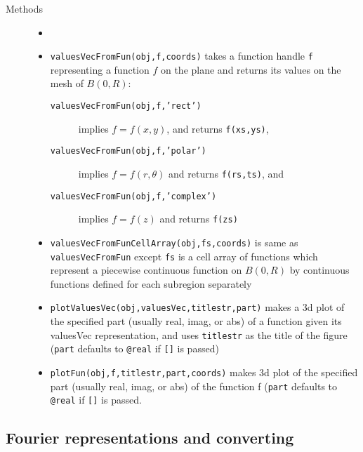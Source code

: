 \begin{description}
 \item[Methods]
   \begin{itemize}
    \item[] %
    \item {\tt valuesVecFromFun(obj,f,coords)} 
          takes a function handle {\tt f} representing a 
          function $f$ on the 
          plane and returns its values on the mesh of $B(0,R)$:
         \begin{description}
          \item[{\tt valuesVecFromFun(obj,f,'rect')}] implies
          $f = f(x,y)$, and returns 
          {\tt f(xs,ys)}, 
          \item[{\tt valuesVecFromFun(obj,f,'polar')}] implies
          $f = f(r,\theta)$ and returns
          {\tt f(rs,ts)}, and
          \item[{\tt valuesVecFromFun(obj,f,'complex')}] implies
          $f = f(z)$ and returns
          {\tt f(zs)}
         \end{description}
    \item {\tt valuesVecFromFunCellArray(obj,fs,coords)} is same
          as {\tt valuesVecFromFun} except {\tt fs} is
          a cell array of functions which represent a piecewise
          continuous function on $B(0,R)$ by continuous functions
          defined for each subregion separately
    \item {\tt plotValuesVec(obj,valuesVec,titlestr,part)}
          makes a 3d plot of the specified part 
          (usually real, imag, or abs)
          of a function given its 
          valuesVec representation, and uses {\tt titlestr} 
          as the title of the
          figure ({\tt part} defaults to {\tt @real} 
          if {\tt []} is passed)
    \item {\tt plotFun(obj,f,titlestr,part,coords)} makes
          3d plot of the specified part (usually real, imag,
          or abs) of the function f
          ({\tt part} defaults to {\tt @real} if {\tt []} is passed.
   \end{itemize}
\end{description}

\subsection{Fourier representations and converting}
\label{sec-scattResComp2d-fourier}

